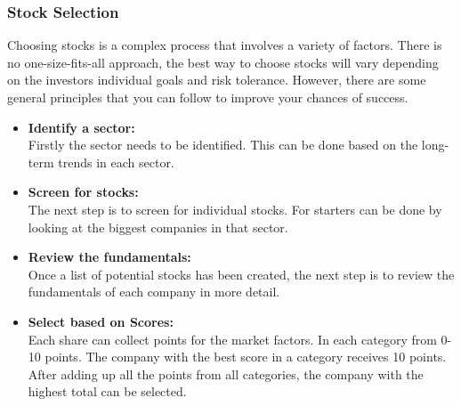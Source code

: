 \subsubsection{Stock Selection}\label{sec: Stock Selection}
Choosing stocks is a complex process that involves a variety of factors. There is no one-size-fits-all approach, the best way to choose stocks will vary depending on the investors individual goals and risk tolerance. However, there are some general principles that you can follow to improve your chances of success.\\
\begin{itemize}%
	\item \textbf{Identify a sector:}\\
	Firstly the sector needs to be identified. This can be done based on the long-term trends in each sector. 
	\item \textbf{Screen for stocks:}\\
	The next step is to screen for individual stocks. For starters can be done by looking at the biggest companies in that sector.
	\item \textbf{Review the fundamentals:}\\
	Once a list of potential stocks has been created, the next step is to review the fundamentals of each company in more detail. 
	\item \textbf{Select based on Scores:}\\
	Each share can collect points for the market factors. In each category from 0-10 points. The company with the best score in a category receives 10 points. After adding up all the points from all categories, the company with the highest total can be selected.\\
\end{itemize}
